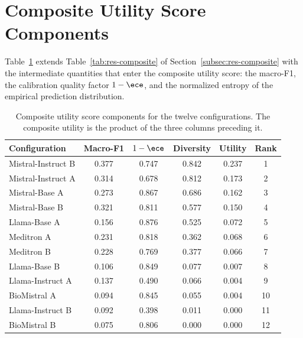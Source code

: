 \section{Composite Utility Score Components}
\label{sec:app-composite}

Table~\ref{tab:app-composite} extends Table~\ref{tab:res-composite} of 
Section~\ref{subsec:res-composite} with the intermediate quantities 
that enter the composite utility score: the macro-F1, the calibration 
quality factor $1 - \ece$, and the normalized entropy of the empirical 
prediction distribution.

\begin{table}[htbp]
    \centering
    \caption{Composite utility score components for the twelve 
        configurations. The composite utility is the product of the 
        three columns preceding it.}
    \label{tab:app-composite}
    \small
    \begin{tabular}{@{}lccccc@{}}
        \toprule
        \textbf{Configuration} & 
        \textbf{Macro-F1} & 
        \boldmath$1-\ece$ & 
        \textbf{Diversity} & 
        \textbf{Utility} & 
        \textbf{Rank} \\
        \midrule
        Mistral-Instruct B & 0.377 & 0.747 & 0.842 & 0.237 & 1 \\
        Mistral-Instruct A & 0.314 & 0.678 & 0.812 & 0.173 & 2 \\
        Mistral-Base A     & 0.273 & 0.867 & 0.686 & 0.162 & 3 \\
        Mistral-Base B     & 0.321 & 0.811 & 0.577 & 0.150 & 4 \\
        Llama-Base A       & 0.156 & 0.876 & 0.525 & 0.072 & 5 \\
        Meditron A         & 0.231 & 0.818 & 0.362 & 0.068 & 6 \\
        Meditron B         & 0.228 & 0.769 & 0.377 & 0.066 & 7 \\
        Llama-Base B       & 0.106 & 0.849 & 0.077 & 0.007 & 8 \\
        Llama-Instruct A   & 0.137 & 0.490 & 0.066 & 0.004 & 9 \\
        BioMistral A       & 0.094 & 0.845 & 0.055 & 0.004 & 10 \\
        Llama-Instruct B   & 0.092 & 0.398 & 0.011 & 0.000 & 11 \\
        BioMistral B       & 0.075 & 0.806 & 0.000 & 0.000 & 12 \\
        \bottomrule
    \end{tabular}
\end{table}
